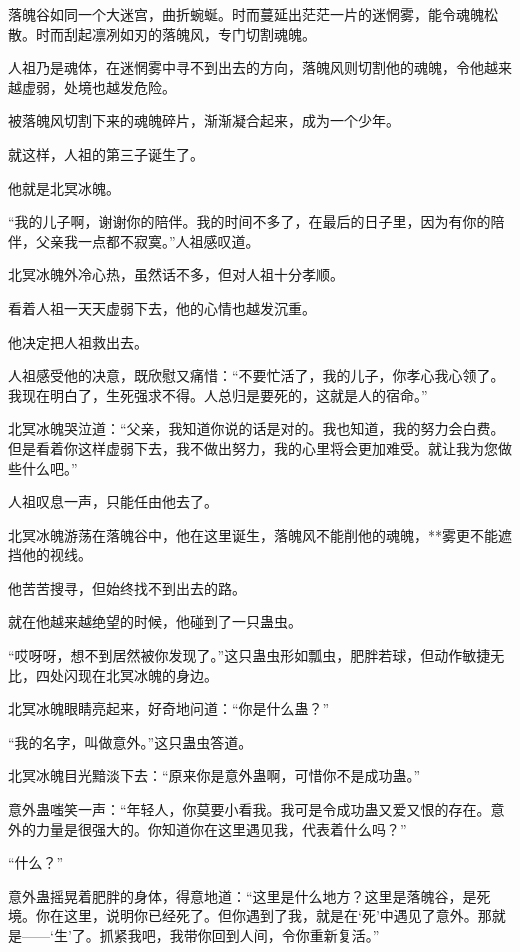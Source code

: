 \begin{this_body}
落魄谷如同一个大迷宫，曲折蜿蜒。时而蔓延出茫茫一片的迷惘雾，能令魂魄松散。时而刮起凛冽如刃的落魄风，专门切割魂魄。

人祖乃是魂体，在迷惘雾中寻不到出去的方向，落魄风则切割他的魂魄，令他越来越虚弱，处境也越发危险。

被落魄风切割下来的魂魄碎片，渐渐凝合起来，成为一个少年。

就这样，人祖的第三子诞生了。

他就是北冥冰魄。

“我的儿子啊，谢谢你的陪伴。我的时间不多了，在最后的日子里，因为有你的陪伴，父亲我一点都不寂寞。”人祖感叹道。

北冥冰魄外冷心热，虽然话不多，但对人祖十分孝顺。

看着人祖一天天虚弱下去，他的心情也越发沉重。

他决定把人祖救出去。

人祖感受他的决意，既欣慰又痛惜：“不要忙活了，我的儿子，你孝心我心领了。我现在明白了，生死强求不得。人总归是要死的，这就是人的宿命。”

北冥冰魄哭泣道：“父亲，我知道你说的话是对的。我也知道，我的努力会白费。但是看着你这样虚弱下去，我不做出努力，我的心里将会更加难受。就让我为您做些什么吧。”

人祖叹息一声，只能任由他去了。

北冥冰魄游荡在落魄谷中，他在这里诞生，落魄风不能削他的魂魄，**雾更不能遮挡他的视线。

他苦苦搜寻，但始终找不到出去的路。

就在他越来越绝望的时候，他碰到了一只蛊虫。

“哎呀呀，想不到居然被你发现了。”这只蛊虫形如瓢虫，肥胖若球，但动作敏捷无比，四处闪现在北冥冰魄的身边。

北冥冰魄眼睛亮起来，好奇地问道：“你是什么蛊？”

“我的名字，叫做意外。”这只蛊虫答道。

北冥冰魄目光黯淡下去：“原来你是意外蛊啊，可惜你不是成功蛊。”

意外蛊嗤笑一声：“年轻人，你莫要小看我。我可是令成功蛊又爱又恨的存在。意外的力量是很强大的。你知道你在这里遇见我，代表着什么吗？”

“什么？”

意外蛊摇晃着肥胖的身体，得意地道：“这里是什么地方？这里是落魄谷，是死境。你在这里，说明你已经死了。但你遇到了我，就是在‘死’中遇见了意外。那就是——‘生’了。抓紧我吧，我带你回到人间，令你重新复活。”


\end{this_body}
